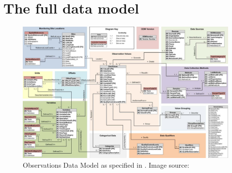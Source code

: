 \documentclass[a4paper]{article}
\begin{document}
\appendix
\section{The full data model}
\label{sec:odmmodel}
\begin{figure}
\includegraphics{odm}
\caption{Observations Data Model as specified in \citet{Tarboton2008}. Image source: \citet{Tarboton2008}}
\end{figure}



\end{document}
